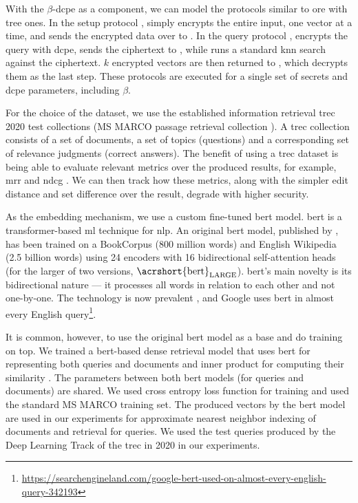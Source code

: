 			With the $\beta$-\acrshort{dcpe} as a component, we can model the \kanon{} protocols similar to \acrshort{ore} with \BPlus{} tree ones.
			In the setup protocol \protocolSetup{}, \user{} simply encrypts the entire input, one vector at a time, and sends the encrypted data over to \server{}.
			In the query protocol \protocolQuery{}, \user{} encrypts the query with \acrshort{dcpe}, sends the ciphertext to \server{}, while \server{} runs a standard \acrshort{knn} search against the ciphertext.
			$k$ encrypted vectors are then returned to \user{}, which decrypts them as the last step.
			These protocols are executed for a single set of secrets and \acrshort{dcpe} parameters, including $\beta$.

			For the choice of the dataset, we use the established information retrieval \acrshort{trec} 2020 test collections (MS MARCO passage retrieval collection \cite{ms-marco}).
			A \acrshort{trec} collection consists of a set of documents, a set of topics (questions) and a corresponding set of relevance judgments (correct answers).
			The benefit of using a \acrshort{trec} dataset is being able to evaluate relevant metrics over the produced results, for example, \acrshort{mrr} \cite{mrr} and \acrshort{ndcg} \cite{dcg}.
			We can then track how these metrics, along with the simpler edit distance and set difference over the result, degrade with higher security.

			As the embedding mechanism, we use a custom fine-tuned \acrshort{bert} model.
			\acrfull{bert} is a transformer-based \acrshort{ml} technique for \acrlong{nlp}.
			An original \acrshort{bert} model, published by \textcite{bert}, has been trained on a BookCorpus \cite{bookcorpus} (800 million words) and English Wikipedia (2.5 billion words) using 24 encoders with 16 bidirectional self-attention heads (for the larger of two versions, $\text{\acrshort{bert}}_\text{LARGE}$).
			\acrshort{bert}'s main novelty is its bidirectional nature --- it processes all words in relation to each other and not one-by-one.
			The technology is now prevalent \cite{bert-is-prevalent}, and Google uses \acrshort{bert} in almost every English query\footnote{
				\url{https://searchengineland.com/google-bert-used-on-almost-every-english-query-342193}
			}.

			It is common, however, to use the original \acrshort{bert} model as a base and do training on top.
			We trained a \acrshort{bert}-based dense retrieval model that uses \acrshort{bert} for representing both queries and documents and inner product for computing their similarity \cite{hamed-custom-bert}.
			The parameters between both \acrshort{bert} models (for queries and documents) are shared.
			We used cross entropy loss function for training and used the standard MS MARCO \cite{ms-marco} training set.
			The produced vectors by the \acrshort{bert} model are used in our experiments for approximate nearest neighbor indexing of documents and retrieval for queries.
			We used the test queries produced by the Deep Learning Track of the \acrfull{trec} in 2020 in our experiments.

